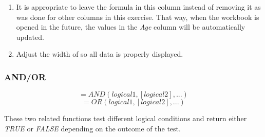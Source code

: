 \begin{enumerate}
	\item It is appropriate to leave the formula in this column instead of removing it as was done for other columns in this exercise. That way, when the workbook is opened in the future, the values in the \textit{Age} column will be automatically updated.
	\item Adjust the width of  so all data is properly displayed.
\end{enumerate}

\subsubsection{AND/OR}

\[ =AND(logical1, [logical2], ...) \]
\[ =OR(logical1, [logical2], ...) \]

These two related functions test different logical conditions and return either \textit{TRUE} or \textit{FALSE} depending on the outcome of the test. 

